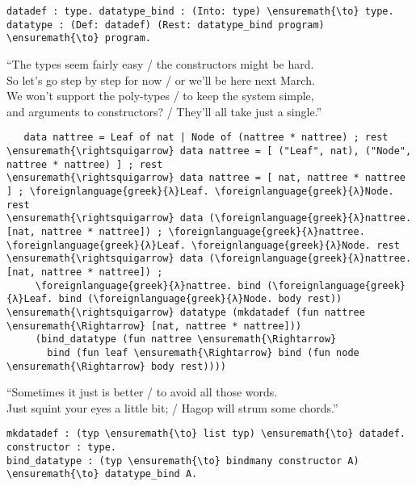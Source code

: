 \begin{verbatim}
datadef : type. datatype_bind : (Into: type) \ensuremath{\to} type.
datatype : (Def: datadef) (Rest: datatype_bind program) \ensuremath{\to} program.
\end{verbatim}

\begin{versy}
``The types seem fairly easy / the constructors might be hard. \\
So let's go step by step for now / or we'll be here next March. \\
We won't support the poly-types / to keep the system simple, \\
and arguments to constructors? / They'll all take just a single.''
\end{versy}

\begin{verbatim}
   data nattree = Leaf of nat | Node of (nattree * nattree) ; rest
\ensuremath{\rightsquigarrow} data nattree = [ ("Leaf", nat), ("Node", nattree * nattree) ] ; rest
\ensuremath{\rightsquigarrow} data nattree = [ nat, nattree * nattree ] ; \foreignlanguage{greek}{λ}Leaf. \foreignlanguage{greek}{λ}Node. rest
\ensuremath{\rightsquigarrow} data (\foreignlanguage{greek}{λ}nattree. [nat, nattree * nattree]) ; \foreignlanguage{greek}{λ}nattree. \foreignlanguage{greek}{λ}Leaf. \foreignlanguage{greek}{λ}Node. rest
\ensuremath{\rightsquigarrow} data (\foreignlanguage{greek}{λ}nattree. [nat, nattree * nattree]) ;
     \foreignlanguage{greek}{λ}nattree. bind (\foreignlanguage{greek}{λ}Leaf. bind (\foreignlanguage{greek}{λ}Node. body rest))
\ensuremath{\rightsquigarrow} datatype (mkdatadef (fun nattree \ensuremath{\Rightarrow} [nat, nattree * nattree]))
     (bind_datatype (fun nattree \ensuremath{\Rightarrow}
       bind (fun leaf \ensuremath{\Rightarrow} bind (fun node \ensuremath{\Rightarrow} body rest))))
\end{verbatim}

\begin{versy}
``Sometimes it just is better / to avoid all those words. \\
Just squint your eyes a little bit; / Hagop will strum some chords.''
\end{versy}

\begin{verbatim}
mkdatadef : (typ \ensuremath{\to} list typ) \ensuremath{\to} datadef.
constructor : type.
bind_datatype : (typ \ensuremath{\to} bindmany constructor A) \ensuremath{\to} datatype_bind A.
\end{verbatim}

